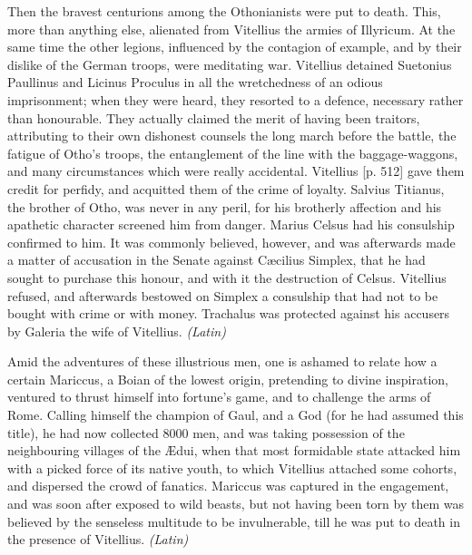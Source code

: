 
Then the bravest centurions among the Othonianists were put to death. This, more than anything else, alienated from Vitellius the armies of Illyricum. At the same time the other legions, influenced by the contagion of example, and by their dislike of the German troops, were meditating war. Vitellius detained Suetonius Paullinus and Licinus Proculus in all the wretchedness of an odious imprisonment; when they were heard, they resorted to a defence, necessary rather than honourable. They actually claimed the merit of having been traitors, attributing to their own dishonest counsels the long march before the battle, the fatigue of Otho's troops, the entanglement of the line with the baggage-waggons, and many circumstances which were really accidental. Vitellius [p. 512] gave them credit for perfidy, and acquitted them of the crime of loyalty. Salvius Titianus, the brother of Otho, was never in any peril, for his brotherly affection and his apathetic character screened him from danger. Marius Celsus had his consulship confirmed to him. It was commonly believed, however, and was afterwards made a matter of accusation in the Senate against Cæcilius Simplex, that he had sought to purchase this honour, and with it the destruction of Celsus. Vitellius refused, and afterwards bestowed on Simplex a consulship that had not to be bought with crime or with money. Trachalus was protected against his accusers by Galeria the wife of Vitellius. \emph{(Latin)}


Amid the adventures of these illustrious men, one is ashamed to relate how a certain Mariccus, a Boian of the lowest origin, pretending to divine inspiration, ventured to thrust himself into fortune's game, and to challenge the arms of Rome. Calling himself the champion of Gaul, and a God (for he had assumed this title), he had now collected 8000 men, and was taking possession of the neighbouring villages of the Ædui, when that most formidable state attacked him with a picked force of its native youth, to which Vitellius attached some cohorts, and dispersed the crowd of fanatics. Mariccus was captured in the engagement, and was soon after exposed to wild beasts, but not having been torn by them was believed by the senseless multitude to be invulnerable, till he was put to death in the presence of Vitellius. \emph{(Latin)}


